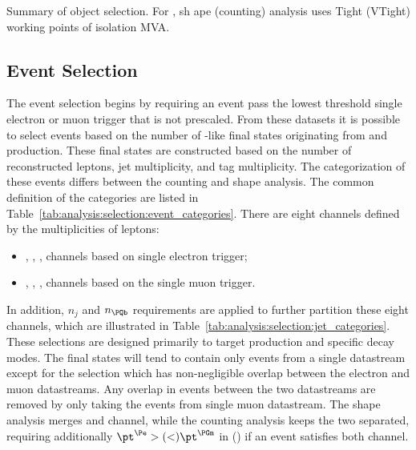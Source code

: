 \begin{table}[ht]
    \centering
    \setlength{\tabcolsep}{0.8em}
    \renewcommand{\arraystretch}{1.5}
    \caption{Summary of object selection. For \PGth, sh
    ape (counting) analysis uses Tight (VTight) working points of \PGth isolation MVA.}
    \label{tab:analysis:selection:ObjectSelectionSum}
    
\end{table}


\FloatBarrier

\subsection{Event Selection}
\label{sec:analysis:selection:event}

The event selection begins by requiring an event pass the lowest \pt threshold single electron or muon trigger that is not prescaled. From these datasets it is possible to select events based on the number of \WW-like final states originating from \ttbar and \tW production.  These final states are constructed based on the number of reconstructed leptons, jet multiplicity, and \PQb tag multiplicity.  The categorization of these events differs between the counting and shape analysis.  The common definition of the categories are listed in Table~\ref{tab:analysis:selection:event_categories}. There are eight channels defined by the multiplicities of leptons: 
\begin{itemize}
    \item \cee, \cem, \cet, \ceh channels based on single electron trigger; 
    \item \cme, \cmm, \cmt, \cmh channels based on the single muon trigger.
\end{itemize}
\noindent In addition, $n_j$ and $n_\PQb$ requirements are applied to further partition these eight channels, which are illustrated in Table~\ref{tab:analysis:selection:jet_categories}. These selections are designed primarily to target \ttbar production and specific \PW decay modes. The final states will tend to contain only events from a single datastream except for the \cem selection which has non-negligible overlap between the electron and muon datastreams. Any overlap in events between the two datastreams are removed by only taking the events from single muon datastream. The shape analysis merges \cem and \cme channel, while the counting analysis keeps the two separated, requiring additionally $\pt^\Pe  >(<) \pt^\PGm$ in \cem (\cme) if an event satisfies both channel.



